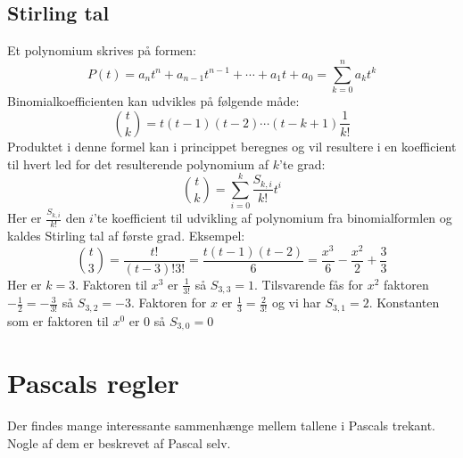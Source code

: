 \subsection{Stirling tal}
Et polynomium skrives på formen:
\[P(t)=a_{n}t^{n}+a_{n-1}t^{n-1}+ \dotsm +a_{1}t+a_{0}=\sum_{k=0}^{n}a_{k}t^{k}\]
Binomialkoefficienten kan udvikles på følgende måde:
\[\binom{t}{k}=t(t-1)(t-2) \dotsm (t-k+1)\frac{1}{k!}\]
Produktet i denne formel kan i princippet beregnes og vil resultere i en koefficient til hvert led for det resulterende polynomium af \(k\)'te grad:
\[\binom{t}{k}=\sum_{i=0}^{k}\frac{S_{k,i}}{k!}t^{i}\]
Her er \(\frac{S_{k,i}}{k!}\) den \(i\)'te koefficient til udvikling af polynomium fra binomialformlen og kaldes Stirling tal af første grad.
Eksempel: 
\[\binom{t}{3}=\frac{t!}{(t-3)!3!}=\frac{t(t-1)(t-2)}{6}=\frac{x^{3}}{6}-\frac{x^{2}}{2}+\frac{3}{3}\]
Her er \(k=3\). Faktoren til \(x^{3}\) er \(\frac{1}{3!}\) så \(S_{3,3}=1\). Tilsvarende fås for \(x^{2}\) faktoren \(-\frac{1}{2}=-\frac{3}{3!}\) så \(S_{3,2}=-3\). Faktoren for \(x\) er \(\frac{1}{3}=\frac{2}{3!}\) og vi har \(S_{3,1}=2\). Konstanten som er faktoren til \(x^{0}\) er \(0\) så \(S_{3,0}=0\)
\section{Pascals regler}
Der findes mange interessante sammenhænge mellem tallene i Pascals trekant. Nogle af dem er beskrevet af Pascal selv.
